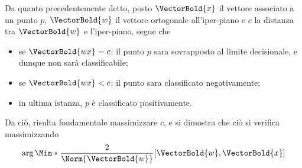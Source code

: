 \documentclass{subfiles}
\begin{document}
Da quanto precedentemente detto, posto $\VectorBold{x}$ il vettore associato a un punto $p$,
$ \VectorBold{w}$ il vettore ortogonale all'iper-piano e $c$ la distanza tra $\VectorBold{w}$ e l'iper-piano, segue che
\begin{itemize}
    \item se $\VectorBold{wx} = c$: il punto $p$ sara sovrapposto al limite decisionale, e dunque non sarà classificabile;
    \item se $\VectorBold{wx} < c$: il punto sara classificato negativamente;
    \item in ultima istanza, $p$ è classificato positivamente.
\end{itemize}
Da ciò, risulta fondamentale massimizzare $c$, e si dimostra che ciò si verifica massimizzando
\begin{equation}
    \arg\Min*{\frac{2}{\Norm{\VectorBold{w}}}}[\VectorBold{w}, \VectorBold{x}]
\end{equation}
\end{document}
